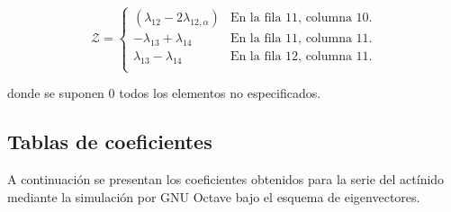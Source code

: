 \begin{equation}
	\mathcal{Z}=\begin{cases}
		(\lambda_{12}-2\lambda_{12, \alpha}) & \textrm{En la fila 11, columna 10.}\\
		-\lambda_{13}+\lambda_{14} & \textrm{En la fila 11, columna 11.}\\
		\lambda_{13}-\lambda_{14}  & \textrm{En la fila 12, columna 11.}\\
	\end{cases}
\end{equation}\label{matriz_estocastica_z}

\noindent donde se suponen 0 todos los elementos no especificados.

\subsection{Tablas de coeficientes}
A continuación se presentan los coeficientes obtenidos para la serie del actínido mediante la simulación por GNU Octave bajo el esquema de eigenvectores. 
